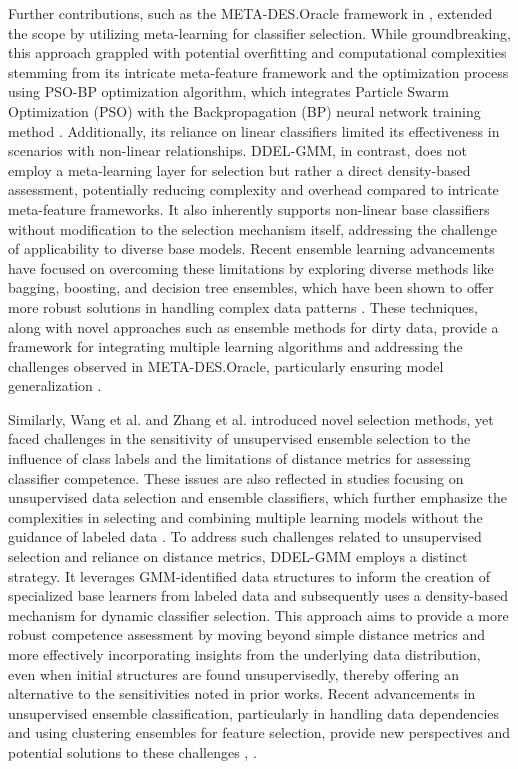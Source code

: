\documentclass[lettersize,journal]{IEEEtran}
\newcommand{\greenhighlight}[1]{\textcolor{highlightgreen}{#1}}
\begin{document}
Further contributions, such as the META-DES.Oracle framework in \cite{cruz_meta-oracle_2017}, extended the scope by utilizing meta-learning for classifier selection. While groundbreaking, this approach grappled with potential overfitting and computational complexities stemming from its intricate meta-feature framework and the optimization process using PSO-BP optimization algorithm, which integrates Particle Swarm Optimization (PSO) with the Backpropagation (BP) neural network training method \cite{al-andoli_ensemble-based_2023}. Additionally, its reliance on linear classifiers limited its effectiveness in scenarios with non-linear relationships. \greenhighlight{DDEL-GMM, in contrast, does not employ a meta-learning layer for selection but rather a direct density-based assessment, potentially reducing complexity and overhead compared to intricate meta-feature frameworks. It also inherently supports non-linear base classifiers without modification to the selection mechanism itself, addressing the challenge of applicability to diverse base models.} Recent ensemble learning advancements have focused on overcoming these limitations by exploring diverse methods like bagging, boosting, and decision tree ensembles, which have been shown to offer more robust solutions in handling complex data patterns \cite{sagi_ensemble_2018}. These techniques, along with novel approaches such as ensemble methods for dirty data, provide a framework for integrating multiple learning algorithms and addressing the challenges observed in META-DES.Oracle, particularly ensuring model generalization \cite{liu_ensemble_2023}.

Similarly, Wang et al. \cite{wang_ensemble_2021} and Zhang et al. \cite{zhang_distance-based_2019} introduced novel selection methods, yet faced challenges in the sensitivity of unsupervised ensemble selection to the influence of class labels and the limitations of distance metrics for assessing classifier competence. These issues are also reflected in studies focusing on unsupervised data selection and ensemble classifiers, which further emphasize the complexities in selecting and combining multiple learning models without the guidance of labeled data \cite{huang_ensemble_2016}. \greenhighlight{To address such challenges related to unsupervised selection and reliance on distance metrics, DDEL-GMM employs a distinct strategy. It leverages GMM-identified data structures to inform the creation of specialized base learners from labeled data and subsequently uses a density-based mechanism for dynamic classifier selection. This approach aims to provide a more robust competence assessment by moving beyond simple distance metrics and more effectively incorporating insights from the underlying data distribution, even when initial structures are found unsupervisedly, thereby offering an alternative to the sensitivities noted in prior works.} Recent advancements in unsupervised ensemble classification, particularly in handling data dependencies and using clustering ensembles for feature selection, provide new perspectives and potential solutions to these challenges \cite{tian_improved_2022}, \cite{traganitis_unsupervised_2022, ayerdi_spatially_2015}.
\end{document}
